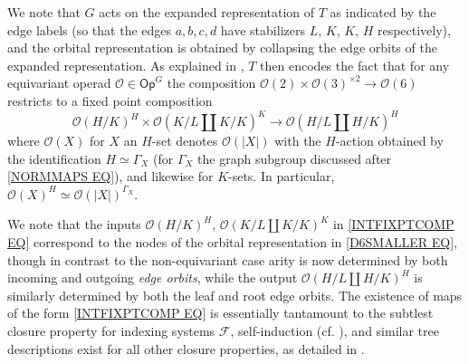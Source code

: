 \documentclass[a4paper,10pt
,draft
]{article}%
\numberwithin{equation}{section}
\numberwithin{figure}{section}
\theoremstyle{definition} %
\renewcommand{\O}{\ensuremath{\mathcal O}}
\newcommand{\1}{\ensuremath{\mathbbm 1}}%
\begin{document}
We note that $G$ acts on the expanded representation of $T$ as indicated by the edge labels (so that the edges $a,b,c,d$ have stabilizers $L$, $K$, $K$, $H$ respectively), and the orbital representation is obtained by collapsing the edge orbits of the expanded representation. As explained in \cite[Example 4.9]{Pe17}, $T$ then encodes the fact that for any 
equivariant operad $\O \in \mathsf{Op}^G$ the composition 
$\mathcal{O}(2) \times \mathcal{O}(3)^{\times 2} \to 
\mathcal{O}(6)$ restricts to a fixed point composition
\begin{equation}\label{INTFIXPTCOMP EQ}
\O(H/K)^{H} \times \O(K/L \amalg K/K)^{K} \to
\O(H/L \amalg H/K)^{H}
\end{equation}
where $\O(X)$ for $X$ an $H$-set denotes
$\O(|X|)$ 
with the $H$-action
obtained by the identification $H \simeq \Gamma_X$
(for $\Gamma_X$ the graph subgroup discussed after 
\eqref{NORMMAPS EQ}),
and likewise for $K$-sets.
In particular, $\O(X)^H \simeq \O(|X|)^{\Gamma_X}$.

We note that the inputs 
$\O(H/K)^{H}$, $\O(K/L \amalg K/K)^{K}$ in
\eqref{INTFIXPTCOMP EQ}
correspond to the nodes of the orbital representation
in \eqref{D6SMALLER EQ}, though in contrast to the non-equivariant case arity is now determined by both incoming and outgoing \textit{edge orbits}, while the output 
$\O(H/L \amalg H/K)^{H}$
is similarly determined by both the leaf and root edge orbits.
The existence of maps of the form \eqref{INTFIXPTCOMP EQ} is essentially tantamount to the subtlest 
closure property for indexing systems $\mathcal{F}$,
self-induction (cf. \cite[Def. 3.20]{BH15}),
and similar tree descriptions exist for all other closure properties, as detailed in 
\cite[\S 9]{Pe17}.
\end{document}
